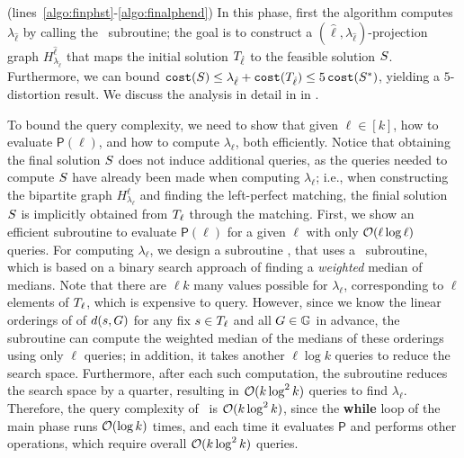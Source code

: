  (lines~\ref{algo:finphst}-\ref{algo:finalphend}) 
In this phase, first the algorithm computes $\lambda_{\hat{\ell}}$ by calling the \findlambda\ subroutine;  the goal is to construct a $(\hat{\ell}, \lambda_{\hat{\ell}})$-projection graph $H^{\hat{\ell}}_{\lambda_{\hat{\ell}}}$ that maps the initial solution $T_{\hat{\ell}}$ to the feasible solution $S$.
Furthermore, we can bound $\texttt{cost}(S) \leq \lambda_{\hat{\ell}} + \texttt{cost}(T_{\hat{\ell}}) \leq 5\, \texttt{cost}(S^*)$, yielding a $5$-distortion result.
We discuss the analysis in detail in in .



\noindent To bound the query complexity, we need to show that given $\ell \in [k]$, how to evaluate $\mathsf{P}(\ell)$, and how to compute $\lambda_\ell$, both efficiently. 
Notice that obtaining the final solution $S$ does not induce additional queries, as the queries needed to compute $S$ have already been made when computing $\lambda_{\ell}$; i.e., when constructing the bipartite graph $H^{\ell}_{\lambda_{\ell}}$ and finding the left-perfect matching, the finial solution $S$ is implicitly obtained from $T_{\ell}$ through the matching.  
First, we show an efficient subroutine to evaluate $\mathsf{P}(\ell)$ for a given $\ell$ with only $\mathcal{O}(\ell \log \ell)$ queries.
For computing $\lambda_\ell$, we design a subroutine \findlambda, that uses a \mom\ subroutine, which is based on a binary search approach of finding a \emph{weighted} median of medians.
Note that there are $\ell k$ many values possible for $\lambda_\ell$, corresponding to $\ell$ elements of $T_\ell$, which is expensive to query. However, since we know the linear orderings of of $d(s, G)$ for any fix $s \in T_\ell$ and all $G \in \mathbb{G}$ in advance, the subroutine can compute the weighted median of the medians of these orderings using only $\ell$ queries; in addition, it takes another $\ell \log k$ queries to reduce the search space. Furthermore, after each such computation, the subroutine reduces the search space by a quarter, resulting in $\mathcal{O}(k \log ^2 k)$ queries to find $\lambda_\ell$.
Therefore, the query complexity of~ is $\mathcal{O}(k\log ^2 k)$, since the \textbf{while} loop of the main phase runs $\mathcal{O}(\log k)$ times, and each time it evaluates $\mathsf{P}$ and performs other operations, which require overall $\mathcal{O}(k\log^2 k)$ queries.



